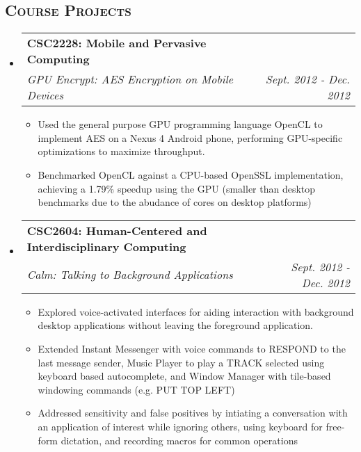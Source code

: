 \documentclass[letterpaper,11pt]{article}
\makeatletter
\newcommand{\company}[1]{
    \textbf{#1}
}
\newcommand{\heading}[1]{
    \textsc{\textbf{#1}}
}
\newcommand*\resheading[1]{\subsection*{\heading{#1}}\vspace{0.3em}\nopagebreak[4]}
\newcommand{\resitem}[1]{\item #1 \vspace{-2pt}}
\newcommand{\ressubheading}[4]{
\begin{tabular*}{6.5in}{l@{\extracolsep{\fill}}r}
    
		\company{#1} & #2 \\
		\textit{#3} & \textit{#4} \\
\end{tabular*}\vspace{-6pt}}
\makeatother
\begin{document}
\resheading{Course Projects}
\begin{itemize}

\item

	\ressubheading{CSC2228: Mobile and Pervasive Computing}{}{GPU Encrypt: AES Encryption on Mobile Devices}{Sept. 2012 - Dec. 2012}
	\begin{itemize}
		\resitem{
            Used the general purpose GPU programming language OpenCL to implement AES on a 
            Nexus 4 Android phone, performing GPU-specific optimizations to maximize 
            throughput.
        }
		\resitem{
            Benchmarked OpenCL against a CPU-based OpenSSL implementation, achieving a 
            1.79\% speedup using the GPU (smaller than desktop benchmarks due to the 
            abudance of cores on desktop platforms)
        }
	\end{itemize}

\item
	\ressubheading{CSC2604: Human-Centered and Interdisciplinary Computing}{}{Calm: Talking to Background Applications}{Sept. 2012 - Dec. 2012}
	\begin{itemize}
		\resitem{
            Explored voice-activated interfaces for aiding interaction with background 
            desktop applications without leaving the foreground application.
        }
		\resitem{
            Extended Instant Messenger with voice commands to RESPOND to the last message 
            sender, Music Player to play a TRACK selected using keyboard based 
            autocomplete, and Window Manager with tile-based windowing commands (e.g. PUT 
            TOP LEFT)
        }
		\resitem{
            Addressed sensitivity and false positives by intiating a conversation with an 
            application of interest while ignoring others, using keyboard for free-form 
            dictation, and recording macros for common operations
        }
	\end{itemize}

\end{itemize}
\end{document}

